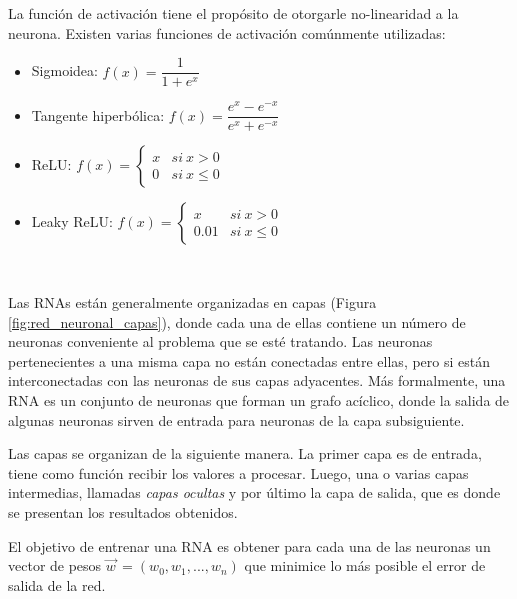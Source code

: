 \documentclass[spanish]{report}
\begin{document}
\newpage
La función de activación tiene el propósito de otorgarle no-linearidad a la neurona. Existen varias funciones de activación comúnmente utilizadas\label{activaciones}:


\begin{itemize}
\item Sigmoidea: $f(x) = \dfrac{1}{1+e^{x}}$
\item Tangente hiperbólica: $f(x) = \dfrac{e^{x}-e^{-x}}{e^{x}+e^{-x}}$
\item ReLU: 
$
f(x) =  \begin{cases}
		    x & si~x > 0 \\
			0 & si~x \leq 0
		\end{cases}
$

\item Leaky ReLU: 
$
f(x) =  \begin{cases}
		    x & si~x > 0 \\
			0.01 & si~x \leq 0
		\end{cases}
$				
\end{itemize}
~\newline

Las RNAs están generalmente organizadas en capas (Figura \ref{fig:red_neuronal_capas}), donde cada una de ellas contiene un número de neuronas  conveniente al problema que se esté tratando. Las neuronas pertenecientes a una misma capa no están conectadas entre ellas, pero si están interconectadas con las neuronas de sus capas adyacentes. Más formalmente, una RNA es un conjunto de neuronas que forman un grafo acíclico, donde la salida de algunas neuronas sirven de entrada para neuronas de la capa subsiguiente.

Las capas se organizan de la siguiente manera. La primer capa es de entrada, tiene como función recibir los valores a procesar. Luego, una o varias capas intermedias, llamadas \textit{capas ocultas} y por último la capa de salida, que es donde se presentan los resultados obtenidos.

El objetivo de entrenar una RNA es obtener para cada una de las neuronas un vector de pesos $\vec{w}^{\,} = (w_0, w_1, ..., w_n)$ que minimice lo más posible el error de salida de la red.
\end{document}
